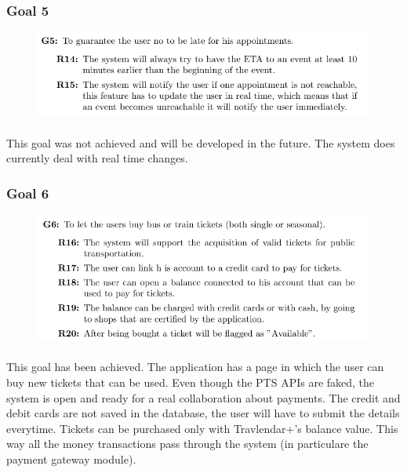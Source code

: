 \documentclass{article}
\begin{document}
			\subsubsection{Goal 5}
			\begin{figure}[H]
			\includegraphics[width=\linewidth]{Images/Goals/Goal_5.png}
			\label{fig:G5}
			\end{figure}
		\paragraph{}This goal was not achieved and will be developed in the future. The system does currently deal with real time changes.
			\subsubsection{Goal 6}
			\begin{figure}[H]
			\includegraphics[width=\linewidth]{Images/Goals/Goal_6.png}
			\label{fig:G6}
			\end{figure}
		\paragraph{}This goal has been achieved. The application has a page in which the user can buy new tickets that can be used. Even though the PTS APIs are faked, the system is open and ready for a real collaboration about payments. The credit and debit cards are not saved in the database, the user will have to submit the details everytime. Tickets can be purchased only with Travlendar+'s balance value. This way all the money transactions pass through the system (in particulare the payment gateway module).
\end{document}
